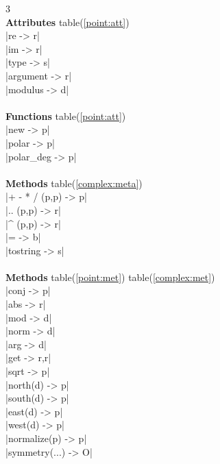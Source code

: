 \documentclass[DIV         = 14,
               fontsize    = 10,
               index       = totoc,
               twoside,
               cadre,
               headings    = small
               ]{tkz-doc}
\begin{document}
\begin{multicols}{3}
\\
\textbf{Attributes} table(\ref{point:att})   \\
|re                        -> r|   \\
|im                        -> r|   \\
|type                      -> s|   \\
|argument                  -> r|   \\
|modulus                   -> d|   \\
\\
\textbf{Functions} table(\ref{point:att})   \\
|new                       -> p|   \\
|polar                     -> p|   \\
|polar_deg                 -> p|   \\
\\
\textbf{Methods} table(\ref{complex:meta})  \\
|+ - * /     (p,p)         -> p|   \\
|..          (p,p)         -> r|   \\
|^           (p,p)         -> r|   \\
|=                         -> b|   \\
|tostring                  -> s|   \\
\\
\textbf{Methods} table(\ref{point:met})  table(\ref{complex:met})    \\
|conj                      -> p|   \\
|abs                       -> r|   \\
|mod                       -> d|   \\
|norm                      -> d|   \\
|arg                       -> d|   \\
|get                     -> r,r|   \\
|sqrt                      -> p|   \\
|north(d)                  -> p|   \\
|south(d)                  -> p|   \\
|east(d)                   -> p|   \\
|west(d)                   -> p|   \\
|normalize(p)              -> p|   \\
|symmetry(...)             -> O|   \\

\end{multicols}
\end{document}
